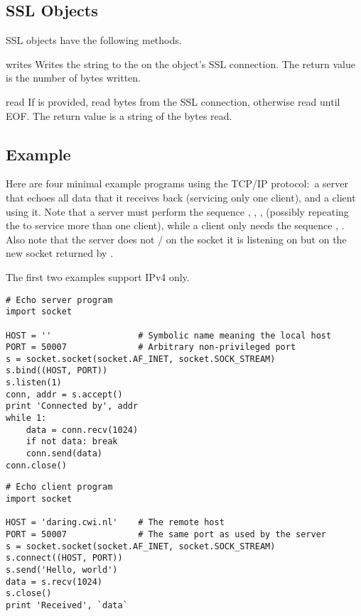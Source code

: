 \subsection{SSL Objects \label{ssl-objects}}

SSL objects have the following methods.

\begin{methoddesc}{write}{s}
Writes the string  to the on the object's SSL connection.
The return value is the number of bytes written.
\end{methoddesc}

\begin{methoddesc}{read}{}
If  is provided, read  bytes from the SSL connection, otherwise
read until EOF. The return value is a string of the bytes read.
\end{methoddesc}

\subsection{Example \label{socket-example}}

Here are four minimal example programs using the TCP/IP protocol:\ a
server that echoes all data that it receives back (servicing only one
client), and a client using it.  Note that a server must perform the
sequence , , ,
 (possibly repeating the  to service
more than one client), while a client only needs the sequence
, .  Also note that the server
does not / on the 
socket it is listening on but on the new socket returned by
.

The first two examples support IPv4 only.

\begin{verbatim}
# Echo server program
import socket

HOST = ''                 # Symbolic name meaning the local host
PORT = 50007              # Arbitrary non-privileged port
s = socket.socket(socket.AF_INET, socket.SOCK_STREAM)
s.bind((HOST, PORT))
s.listen(1)
conn, addr = s.accept()
print 'Connected by', addr
while 1:
    data = conn.recv(1024)
    if not data: break
    conn.send(data)
conn.close()
\end{verbatim}

\begin{verbatim}
# Echo client program
import socket

HOST = 'daring.cwi.nl'    # The remote host
PORT = 50007              # The same port as used by the server
s = socket.socket(socket.AF_INET, socket.SOCK_STREAM)
s.connect((HOST, PORT))
s.send('Hello, world')
data = s.recv(1024)
s.close()
print 'Received', `data`
\end{verbatim}

